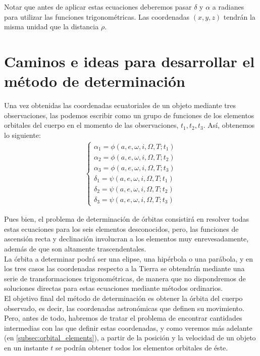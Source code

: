 \documentclass[11pt]{book}
\begin{document}
Notar que antes de aplicar estas ecuaciones deberemos pasar $\delta$ y $\alpha$ a radianes para utilizar las funciones trigonométricas. Las coordenadas $(x,y,z)$ tendrán la misma unidad que la distancia $\rho$.\\

\section{Caminos e ideas para desarrollar el método de determinación}
\label{sec:ideas_for_develope_method}
Una vez obtenidas las coordenadas ecuatoriales de un objeto mediante tres observaciones, las podemos escribir como un grupo de funciones de los elementos orbitales del cuerpo en el momento de las observaciones, $t_1, t_2, t_3$. Así, obtenemos lo siguiente:
\begin{align}
\left\{\begin{array}{l}
	\alpha_1 = \phi(a, e, \omega, i, \Omega, T; t_1)\\ 
	\alpha_2 = \phi(a, e, \omega, i, \Omega, T; t_2)\\ 
	\alpha_3 = \phi(a, e, \omega, i, \Omega, T; t_3)\\ 
	\delta_1 = \psi(a, e, \omega, i, \Omega, T; t_1)\\ 
	\delta_2 = \psi(a, e, \omega, i, \Omega, T; t_2)\\
	\delta_3 = \psi(a, e, \omega, i, \Omega, T; t_3)
\end{array}
\right.
\label{eq:ascension_declinacion}
\end{align}

Pues bien, el problema de determinación de órbitas consistirá en resolver todas estas ecuaciones para los seis elementos desconocidos, pero, las funciones de ascensión recta y declinación involucran a los elementos muy enrevesadamente, además de que son altamente trascendentales.\\

La órbita a determinar podrá ser una elipse, una hipérbola o una parábola, y en los tres casos las coordenadas respecto a la Tierra se obtendrán mediante una serie de transformaciones trigonométricas, de manera que no dispondremos de soluciones directas para estas ecuaciones mediante métodos ordinarios.\\

El objetivo final del método de determinación es obtener la órbita del cuerpo observado, es decir, las coordenadas astronómicas que definen su movimiento. Pero, antes de todo, habremos de tratar el problema de encontrar cantidades intermedias con las que definir estas coordenadas, y como veremos más adelante (en \ref{subsec:orbital_elements}), a partir de la posición y la velocidad de un objeto en un instante $t$ se podrán obtener todos los elementos orbitales de éste.\\
\end{document}
